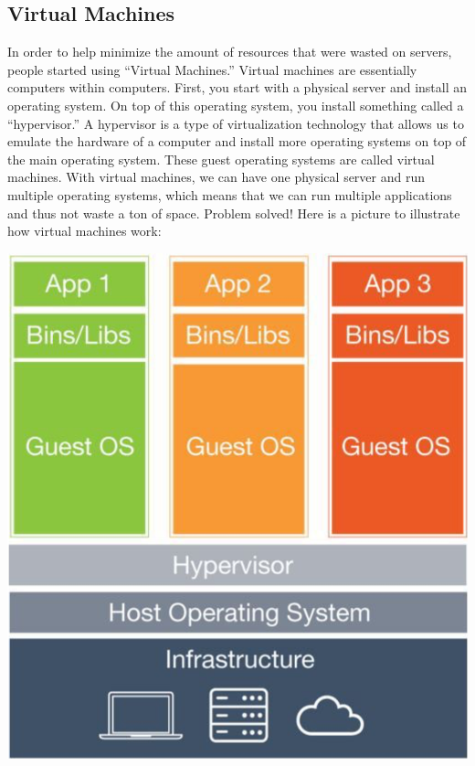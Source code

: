 \subsection{Virtual Machines}
In order to help minimize the amount of resources that were wasted on servers, people started using ``Virtual Machines.'' Virtual machines are essentially computers within computers. First, you start with a physical server and install an operating system. On top of this operating system, you install something called a ``hypervisor.'' A hypervisor is a type of virtualization technology that allows us to emulate the hardware of a computer and install more operating systems on top of the main operating system. These guest operating systems are called virtual machines. With virtual machines, we can have one physical server and run multiple operating systems, which means that we can run multiple applications and thus not waste a ton of space. Problem solved! Here is a picture to illustrate how virtual machines work:
\begin{center}
    \includegraphics[scale=0.4]{virtualmachine1.png}
\end{center}

